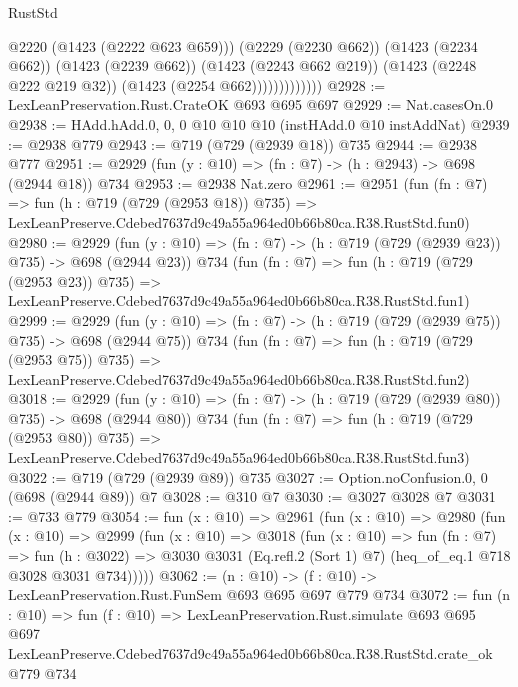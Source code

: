 \begin{lexlean}{RustStd}
\begin{coremodule}
                            @2220
                            (@1423 (@2222 @623 @659)))
                          (@2229 (@2230 @662))
                          (@1423 (@2234 @662))
                          (@1423 (@2239 @662))
                          (@1423 (@2243 @662 @219))
                          (@1423 (@2248 @222 @219 @32))
                          (@1423 (@2254 @662)))))))))))))
@2928 := LexLeanPreservation.Rust.CrateOK @693 @695 @697
@2929 := Nat.casesOn.{0}
@2938 := HAdd.hAdd.{0, 0, 0} @10 @10 @10 (instHAdd.{0} @10 instAddNat)
@2939 := @2938 @779
@2943 := @719 (@729 (@2939 @18)) @735
@2944 := @2938 @777
@2951 := @2929 (fun (y : @10) => (fn : @7) -> (h : @2943) -> @698 (@2944 @18)) @734
@2953 := @2938 Nat.zero
@2961 := @2951
    (fun (fn : @7) =>
    fun (h : @719 (@729 (@2953 @18)) @735) =>
    LexLeanPreserve.Cdebed7637d9c49a55a964ed0b66b80ca.R38.RustStd.fun0)
@2980 := @2929
    (fun (y : @10) => (fn : @7) -> (h : @719 (@729 (@2939 @23)) @735) -> @698 (@2944 @23))
    @734
    (fun (fn : @7) =>
    fun (h : @719 (@729 (@2953 @23)) @735) =>
    LexLeanPreserve.Cdebed7637d9c49a55a964ed0b66b80ca.R38.RustStd.fun1)
@2999 := @2929
    (fun (y : @10) => (fn : @7) -> (h : @719 (@729 (@2939 @75)) @735) -> @698 (@2944 @75))
    @734
    (fun (fn : @7) =>
    fun (h : @719 (@729 (@2953 @75)) @735) =>
    LexLeanPreserve.Cdebed7637d9c49a55a964ed0b66b80ca.R38.RustStd.fun2)
@3018 := @2929
    (fun (y : @10) => (fn : @7) -> (h : @719 (@729 (@2939 @80)) @735) -> @698 (@2944 @80))
    @734
    (fun (fn : @7) =>
    fun (h : @719 (@729 (@2953 @80)) @735) =>
    LexLeanPreserve.Cdebed7637d9c49a55a964ed0b66b80ca.R38.RustStd.fun3)
@3022 := @719 (@729 (@2939 @89)) @735
@3027 := Option.noConfusion.{0, 0} (@698 (@2944 @89)) @7
@3028 := @310 @7
@3030 := @3027 @3028 @7
@3031 := @733 @779
@3054 := fun (x : @10) =>
  @2961
    (fun (x : @10) =>
    @2980
      (fun (x : @10) =>
      @2999
        (fun (x : @10) =>
        @3018
          (fun (x : @10) =>
          fun (fn : @7) =>
          fun (h : @3022) =>
          @3030 @3031 (Eq.refl.{2} (Sort 1) @7) (heq_of_eq.{1} @718 @3028 @3031 @734)))))
@3062 := (n : @10) -> (f : @10) -> LexLeanPreservation.Rust.FunSem @693 @695 @697 @779 @734
@3072 := fun (n : @10) =>
  fun (f : @10) =>
  LexLeanPreservation.Rust.simulate
    @693
    @695
    @697
    LexLeanPreserve.Cdebed7637d9c49a55a964ed0b66b80ca.R38.RustStd.crate_ok
    @779
    @734
\end{coremodule}
\end{lexlean}
